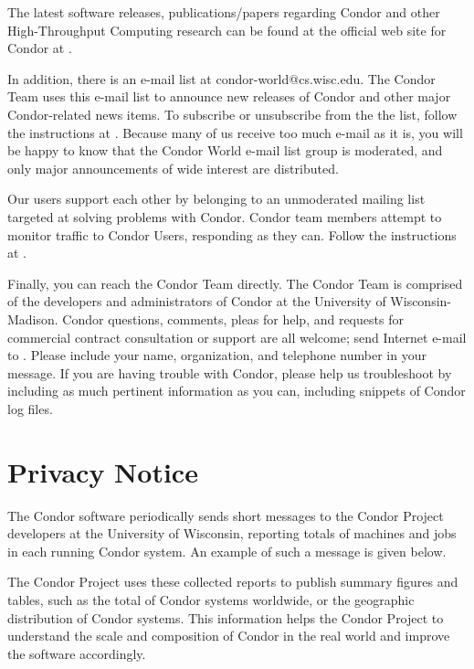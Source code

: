 The latest software releases, publications/papers regarding Condor and other 
High-Throughput Computing
research can be found at the official web site for Condor at  
.

In addition, there is an e-mail list at condor-world@cs.wisc.edu.
The Condor Team uses this e-mail list to announce new releases of
Condor and other major Condor-related news items.
To subscribe or unsubscribe from the the list, follow the instructions at  
.
Because many of us receive 
too much e-mail as it is, you will be happy to know that the
Condor World e-mail list group is 
moderated, and only major announcements of wide interest are distributed.

Our users support each other by belonging to an unmoderated mailing
list targeted at solving problems with Condor.
Condor team members attempt to monitor traffic to Condor Users,
responding as they can. 
Follow the instructions at
.

Finally, you can reach the Condor Team directly.
The Condor Team is comprised of the 
developers and administrators of Condor at the University of Wisconsin-Madison.
Condor questions, comments, pleas for help,
and requests for commercial contract consultation or support 
are all welcome;
send Internet e-mail to
.
Please include your name, organization, and telephone number in your message.
If you are having trouble with Condor,
please help us troubleshoot by including as much pertinent information
as you can, including snippets of Condor log files. 

\section{\label{privacy}Privacy Notice}

%
%

The Condor software periodically sends short messages
to the Condor Project developers at the University of Wisconsin,
reporting totals of machines and jobs in each running Condor system.
An example of such a message is given below.

The Condor Project uses these collected reports to publish
summary figures and tables, such as the total of Condor systems
worldwide, or the geographic distribution of Condor systems.
This information helps the Condor Project to understand
the scale and composition of Condor in the real world
and improve the software accordingly.

